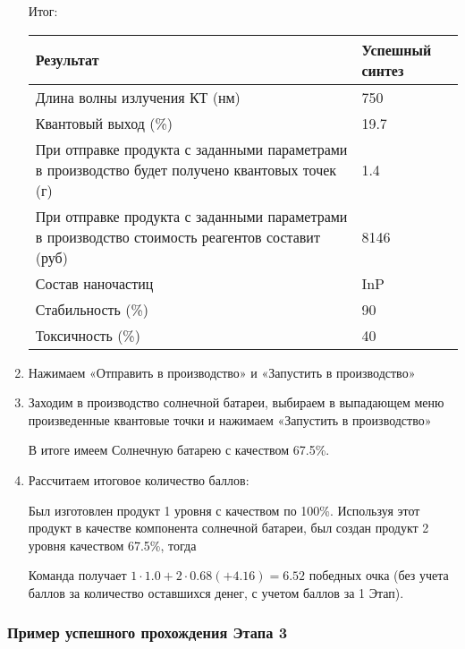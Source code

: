\begin{enumerate}
    Итог:
    \begin{table}[H]
        \begin{center}
            \begin{tabular}{|p{9cm}|p{4cm}|}
                \hline
                Результат	&Успешный синтез \\
                \hline
                Длина волны излучения КТ (нм)	&750 \\
                \hline
                Квантовый выход (\%)&	19.7 \\
                \hline
                При отправке продукта с заданными параметрами в производство будет получено квантовых точек (г)&	1.4 \\
                \hline
                При отправке продукта с заданными параметрами в производство стоимость реагентов составит (руб)&	8146 \\
                \hline
                Состав наночастиц&	InP \\
                \hline
                Стабильность (\%)&	90 \\
                \hline
                Токсичность (\%)	&40 \\
                \hline
            \end{tabular}
        \end{center}
    \end{table}

    \item Нажимаем «Отправить в производство» и «Запустить в производство»
    \item Заходим в производство солнечной батареи, выбираем в выпадающем меню произведенные квантовые точки и нажимаем «Запустить в производство»
    
    В итоге имеем Солнечную батарею с качеством 67.5\%.
    \item Рассчитаем итоговое количество баллов:
    
    Был изготовлен продукт 1 уровня с качеством по 100\%. Используя этот продукт в качестве компонента солнечной батареи, был создан продукт 2 уровня качеством 67.5\%, тогда

    Команда получает $1 \cdot 1.0 + 2 \cdot 0.68 (+4.16) = 6.52$ победных очка (без учета баллов за количество оставшихся денег, с учетом баллов за 1 Этап).
\end{enumerate}

\subsubsection*{Пример успешного прохождения Этапа 3}

